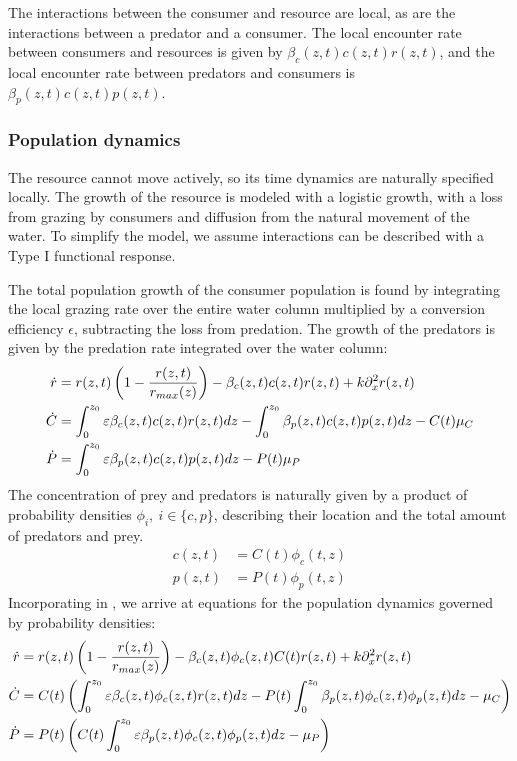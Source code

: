 The interactions between the consumer and resource are local, as are the interactions between a predator and a consumer. The local encounter rate between consumers and resources is given by $\beta_c(z,t)c(z,t)r(z,t)$, and the local encounter rate between predators and consumers is $\beta_p(z,t)c(z,t)p(z,t)$.

\subsubsection*{Population dynamics}
The resource cannot move actively, so its time dynamics are naturally specified locally. The growth of the resource is modeled with a logistic growth, with a loss from grazing by consumers and diffusion from the natural movement of the water. To simplify the model, we assume interactions can be described with a Type I functional response. %


The total population growth of the consumer population is found by integrating the local grazing rate over the entire water column multiplied by a conversion efficiency $\epsilon$, subtracting the loss from predation. The growth of the predators is given by the predation rate integrated over the water column:
\begin{align}
  \label{eq:population_growth}
  \dot{r} &= r(z,t)\left ( 1-\frac{r(z,t)}{r_{max}(z)} \right ) - \beta_c(z,t)c(z,t) r(z,t) + k \partial_x^2 r(z,t) \\
  \dot{C} &=  \int_0^{z_0} \varepsilon \beta_c(z,t)c(z,t)r(z,t) dz- \int_0^{z_0} \beta_p(z,t) c(z,t) p(z,t) dz - C(t)\mu_C  \\
  \dot{P} &=  \int_0^{z_0} \varepsilon \beta_p(z,t) c(z,t)p(z,t) dz - P(t)\mu_P
\end{align}
The concentration of prey and predators is naturally given by a product of probability densities $\phi_i,~i\in \{c,p\}$, describing their location and the total amount of predators and prey.
\begin{align}
  \label{eq:prob_dens}
	c(z,t) &= C(t)\phi_c(t, z) \\
	p(z,t) &= P(t)\phi_p(t, z)
\end{align}
Incorporating  in , we arrive at equations for the population dynamics governed by probability densities:
\begin{align}
  \label{eq:population_growth_prob_dens}
	\dot{r} &= r(z,t)\pa{1-\frac{r(z,t)}{r_{max}(z)}} - \beta_c(z,t)\phi_c(z,t)C(t) r(z,t)  + k \partial_x^2 r(z,t)\\
	\dot{C} &= C(t)\left ( \int_0^{z_0} \varepsilon \beta_c(z,t)\phi_c(z,t)r(z,t) dz- P(t)\int_0^{z_0} \beta_p(z,t) \phi_c(z,t) \phi_p(z,t) dz - \mu_C \right ) \\
	\dot{P} &= P(t) \left ( C(t )\int_0^{z_0} \varepsilon \beta_p(z,t) \phi_c(z,t)\phi_p(z,t) dz - \mu_P \right )
\end{align}


